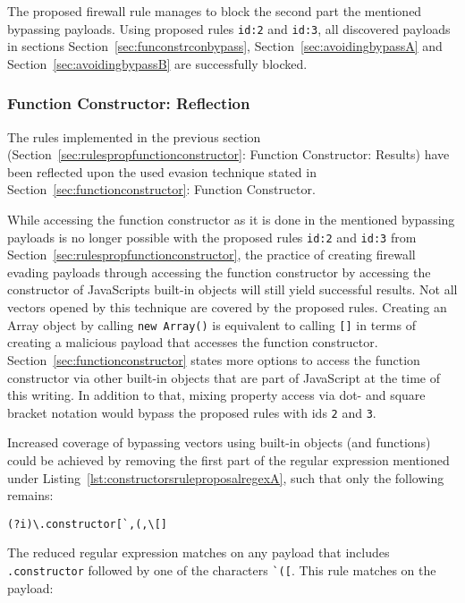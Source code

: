 The proposed firewall rule manages to block the second part the mentioned bypassing payloads. Using proposed rules \verb|id:2| and \verb|id:3|, all discovered payloads in sections Section~\ref{sec:funconstrconbypass}, Section~\ref{sec:avoidingbypassA} and Section~\ref{sec:avoidingbypassB} are successfully blocked.


\subsubsection{Function Constructor: Reflection}
\label{sec:rulespropfunctionconstructorreflection}
The rules implemented in the previous section (Section~\ref{sec:rulespropfunctionconstructor}: Function Constructor: Results) have been reflected upon the used evasion technique stated in Section~\ref{sec:functionconstructor}: Function Constructor.

While accessing the function constructor as it is done in the mentioned bypassing payloads is no longer possible with the proposed rules \verb|id:2| and \verb|id:3| from Section~\ref{sec:rulespropfunctionconstructor}, the practice of creating firewall evading payloads through accessing the function constructor by accessing the constructor of JavaScripts built-in objects will still yield successful results. Not all vectors opened by this technique are covered by the proposed rules. Creating an Array object by calling \verb|new Array()| is equivalent to calling \verb|[]| in terms of creating a malicious payload that accesses the function constructor. Section~\ref{sec:functionconstructor} states more options to access the function constructor via other built-in objects that are part of JavaScript at the time of this writing. In addition to that, mixing property access via dot- and square bracket notation would bypass the proposed rules with ids \verb|2| and \verb|3|.

Increased coverage of bypassing vectors using built-in objects (and functions) could be achieved by removing the first part of the regular expression mentioned under Listing~\ref{lst:constructorsruleproposalregexA}, such that only the following remains:

\begin{lstlisting}[style=basicStyle, caption=reduced regex of proposed rule id:2, label={lst:constructorsruleproposalregexB}]
(?i)\.constructor[`,(,\[]
\end{lstlisting}

The reduced regular expression matches on any payload that includes \verb|.constructor| followed by one of the characters \verb|`([|. This rule matches on the payload:

